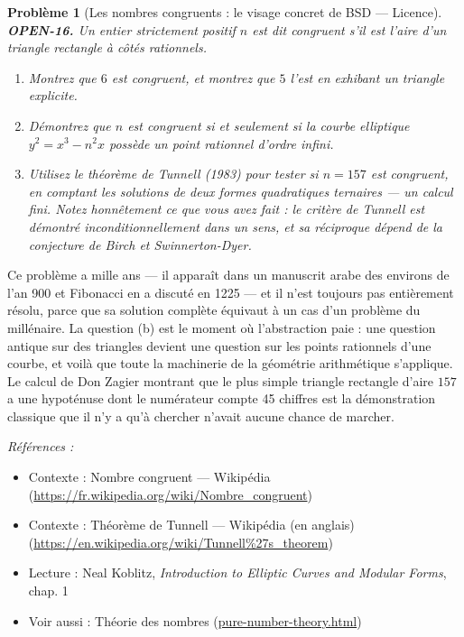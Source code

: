 \documentclass[11pt]{article}
\newtheorem{problem}{Problème}
\newenvironment{refs}{\par\small\noindent\emph{Références :}\begin{itemize}\setlength\itemsep{0pt}}{\end{itemize}\normalsize}
\begin{document}
\bigskip

\begin{problem}[{Les nombres congruents : le visage concret de BSD --- Licence}]
\textbf{OPEN-16.} Un entier strictement positif $ n $ est dit \textit{congruent} s'il
est l'aire d'un triangle rectangle à côtés rationnels.
\begin{enumerate}
\item[(a)] Montrez que $ 6 $ est congruent, et montrez que $ 5 $ l'est en exhibant un
triangle explicite.
\item[(b)] Démontrez que $ n $ est congruent si et seulement si la courbe elliptique
$ y^2 = x^3 - n^2 x $ possède un point rationnel d'ordre infini.
\item[(c)] Utilisez le théorème de Tunnell (1983) pour tester si $ n = 157 $ est congruent, en
comptant les solutions de deux formes quadratiques ternaires --- un calcul fini. Notez
honnêtement ce que vous avez fait : le critère de Tunnell est démontré inconditionnellement
dans un sens, et sa réciproque dépend de la conjecture de Birch et Swinnerton-Dyer.
\end{enumerate}

\end{problem}

\noindent Ce problème a mille ans --- il apparaît dans un manuscrit arabe des
environs de l'an 900 et Fibonacci en a discuté en 1225 --- et il n'est toujours pas
entièrement résolu, parce que sa solution complète équivaut à un cas d'un problème du
millénaire. La question (b) est le moment où l'abstraction paie : une question antique sur
des triangles devient une question sur les points rationnels d'une courbe, et voilà que
toute la machinerie de la géométrie arithmétique s'applique. Le calcul de Don Zagier
montrant que le plus simple triangle rectangle d'aire $ 157 $ a une hypoténuse dont le
numérateur compte 45 chiffres est la démonstration classique que \og{} il n'y a qu'à
chercher \fg{} n'avait aucune chance de marcher.

\begin{refs}
\item Contexte : Nombre congruent --- Wikipédia (\url{https://fr.wikipedia.org/wiki/Nombre_congruent})
\item Contexte : Théorème de Tunnell --- Wikipédia (en anglais) (\url{https://en.wikipedia.org/wiki/Tunnell%27s_theorem})
\item Lecture : Neal Koblitz, \textit{Introduction to Elliptic Curves and Modular Forms}, chap. 1
\item Voir aussi : Théorie des nombres (\url{pure-number-theory.html})
\end{refs}
\end{document}
